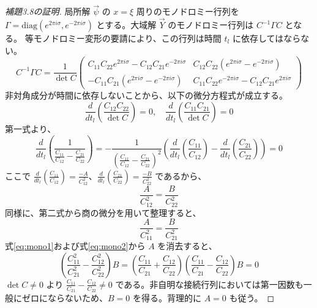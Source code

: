\begin{story}
\begin{proof}[補題3.8の証明]
局所解 $\vec{\psi}$ の $x=\xi$ 周りのモノドロミー行列を $\Gamma = \mathrm{diag}(e^{2\pi i \sigma}, e^{-2\pi i \sigma})$ とする。大域解 $\vec{Y}$ のモノドロミー行列は $C^{-1}\Gamma C$ となる。
等モノドロミー変形の要請により、この行列は時間 $t_l$ に依存してはならない。
\begin{equation}
    C^{-1}\Gamma C = \frac{1}{\det C} 
    \begin{pmatrix} 
        C_{11}C_{22}e^{2\pi i \sigma} - C_{12}C_{21}e^{-2\pi i \sigma} & C_{12}C_{22}(e^{2\pi i \sigma} - e^{-2\pi i \sigma}) \\ 
        -C_{11}C_{21}(e^{2\pi i \sigma} - e^{-2\pi i \sigma}) & C_{11}C_{22}e^{-2\pi i \sigma} - C_{12}C_{21}e^{2\pi i \sigma} 
    \end{pmatrix}
\end{equation}
非対角成分が時間に依存しないことから、以下の微分方程式が成立する。
\begin{equation}
    \frac{d}{dt_l} \left( \frac{C_{12}C_{22}}{\det C} \right) = 0, \quad \frac{d}{dt_l} \left( \frac{C_{11}C_{21}}{\det C} \right) = 0
\end{equation}
第一式より、
\begin{equation*}
    \frac{d}{dt_l} \left( \frac{1}{\frac{C_{11}}{C_{12}} - \frac{C_{21}}{C_{22}}} \right) = -\frac{1}{\left(\frac{C_{11}}{C_{12}} - \frac{C_{21}}{C_{22}}\right)^2} \left( \frac{d}{dt_l}\left(\frac{C_{11}}{C_{12}}\right) - \frac{d}{dt_l}\left(\frac{C_{21}}{C_{22}}\right) \right) = 0
\end{equation*}
ここで $\frac{d}{dt_l}\left(\frac{C_{11}}{C_{12}}\right) = \frac{-A}{C_{12}^2}$、$\frac{d}{dt_l}\left(\frac{C_{21}}{C_{22}}\right) = \frac{-B}{C_{22}^2}$ であるから、
\begin{equation}
    \frac{A}{C_{12}^2} = \frac{B}{C_{22}^2} \label{eq:mono1}
\end{equation}
同様に、第二式から商の微分を用いて整理すると、
\begin{equation}
    \frac{A}{C_{11}^2} = \frac{B}{C_{21}^2} \label{eq:mono2}
\end{equation}
式\eqref{eq:mono1}および式\eqref{eq:mono2}から $A$ を消去すると、
\begin{equation}
    \left( \frac{C_{11}^2}{C_{21}^2} - \frac{C_{12}^2}{C_{22}^2} \right) B = \left( \frac{C_{11}}{C_{21}} + \frac{C_{12}}{C_{22}} \right) \left( \frac{C_{11}}{C_{21}} - \frac{C_{12}}{C_{22}} \right) B = 0
\end{equation}
$\det C \neq 0$ より $\frac{C_{11}}{C_{21}} - \frac{C_{12}}{C_{22}} \neq 0$ である。非自明な接続行列においては第一因数も一般にゼロにならないため、$B=0$ を得る。背理的に $A=0$ も従う。

\end{proof}
\end{story}
